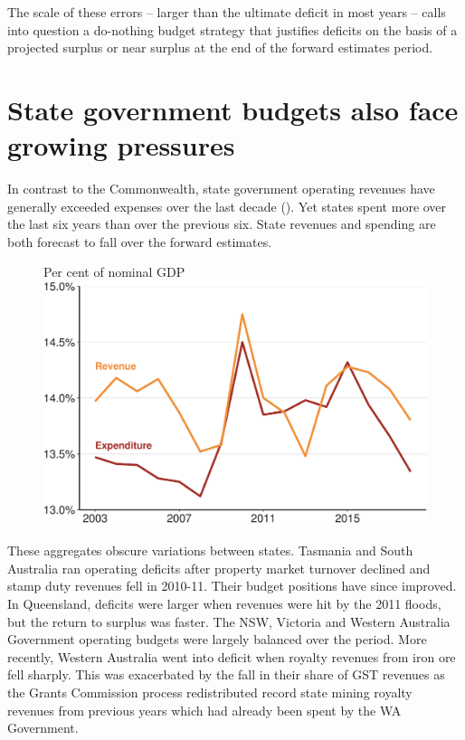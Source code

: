 The scale of these errors – larger than the ultimate deficit in most years – calls into question a do-nothing budget strategy that justifies deficits on the basis of a projected surplus or near surplus at the end of the forward estimates period. 

\chapter{State government budgets also face growing pressures\label{chapter:FISCAL-4}}
In contrast to the Commonwealth, state government operating revenues have generally exceeded expenses over the last decade (). Yet states spent more over the last six years than over the previous six. State revenues and spending are both forecast to fall over the forward estimates. 

\begin{figure}
%
{Per cent of nominal GDP}
\includegraphics[width=\columnwidth]{Fiscal-challenges/figure/Figure11-1.pdf}

\end{figure}

These aggregates obscure variations between states. Tasmania and South Australia ran operating deficits after property market turnover declined and stamp duty revenues fell in 2010-11. Their budget positions have since improved. In Queensland, deficits were larger when revenues were hit by the 2011 floods, but the return to surplus was faster. The NSW, Victoria and Western Australia Government operating budgets were largely balanced over the period. More recently, Western Australia went into deficit when royalty revenues from iron ore fell sharply. This was exacerbated by the fall in their share of GST revenues as the Grants Commission process redistributed record state mining royalty revenues from previous years which had already been spent by the WA Government.

